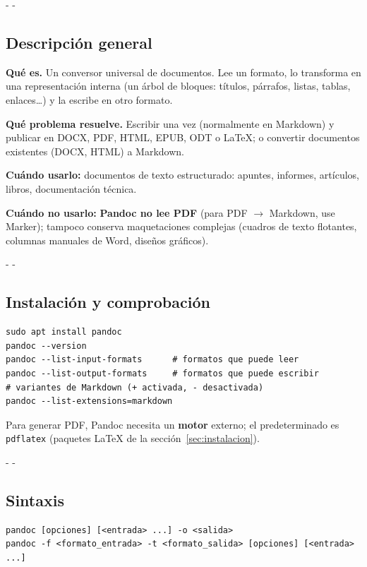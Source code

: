 \documentclass[11pt,a4paper]{article}
\makeatletter
\newcommand{\necesitaespacio}[1]{\par\penalty-100\begingroup
	\setlength{\dimen@}{#1}\dimen@ii\pagegoal\advance\dimen@ii-\pagetotal
	\ifdim\dimen@>\dimen@ii\ifdim\dimen@ii>\z@\vfil\fi\penalty-\@M\fi\endgroup}
\newcommand{\cmd}[1]{\texttt{\textcolor{colcmd}{#1}}}      %
\makeatother
\begin{document}
	\necesitaespacio{8\baselineskip}
	\subsection{Descripción general}
	
	\textbf{Qué es.} Un conversor universal de documentos. Lee un formato, lo transforma en una representación interna (un árbol de bloques: títulos, párrafos, listas, tablas, enlaces\ldots) y la escribe en otro formato.
	
	\textbf{Qué problema resuelve.} Escribir una vez (normalmente en Markdown) y publicar en DOCX, PDF, HTML, EPUB, ODT o LaTeX; o convertir documentos existentes (DOCX, HTML) a Markdown.
	
	\textbf{Cuándo usarlo:} documentos de texto estructurado: apuntes, informes, artículos, libros, documentación técnica.
	
	\textbf{Cuándo no usarlo:} \textbf{Pandoc no lee PDF} (para PDF $\rightarrow$ Markdown, use Marker); tampoco conserva maquetaciones complejas (cuadros de texto flotantes, columnas manuales de Word, diseños gráficos).
	
	\necesitaespacio{8\baselineskip}
	\subsection{Instalación y comprobación}
	
	\begin{lstlisting}
sudo apt install pandoc
pandoc --version
pandoc --list-input-formats      # formatos que puede leer
pandoc --list-output-formats     # formatos que puede escribir
# variantes de Markdown (+ activada, - desactivada)
pandoc --list-extensions=markdown
\end{lstlisting}
	
	Para generar PDF, Pandoc necesita un \textbf{motor} externo; el predeterminado es \cmd{pdflatex} (paquetes LaTeX de la sección~\ref{sec:instalacion}).
	
	\necesitaespacio{8\baselineskip}
	\subsection{Sintaxis}
	
	\begin{lstlisting}[style=sintaxis]
pandoc [opciones] [<entrada> ...] -o <salida>
pandoc -f <formato_entrada> -t <formato_salida> [opciones] [<entrada> ...]
\end{lstlisting}
	
\end{document}
